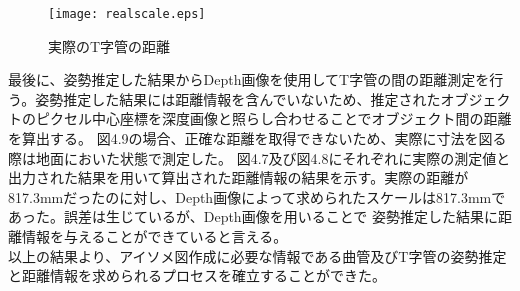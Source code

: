 \begin{figure}[htbt]
	\centering
	 \texttt{[image: realscale.eps]}
	 \caption{実際のT字管の距離}
	 \label{fig:f2}
\end{figure}

最後に、姿勢推定した結果からDepth画像を使用してT字管の間の距離測定を行う。姿勢推定した結果には距離情報を含んでいないため、推定されたオブジェクトのピクセル中心座標を深度画像と照らし合わせることでオブジェクト間の距離を算出する。
図4.9の場合、正確な距離を取得できないため、実際に寸法を図る際は地面においた状態で測定した。
図4.7及び図4.8にそれぞれに実際の測定値と出力された結果を用いて算出された距離情報の結果を示す。実際の距離が817.3mmだったのに対し、Depth画像によって求められたスケールは817.3mmであった。誤差は生じているが、Depth画像を用いることで
姿勢推定した結果に距離情報を与えることができていると言える。\\
以上の結果より、アイソメ図作成に必要な情報である曲管及びT字管の姿勢推定と距離情報を求められるプロセスを確立することができた。